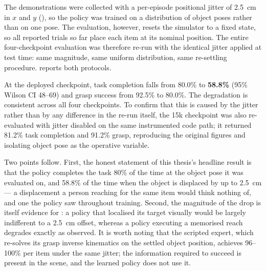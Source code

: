 The demonstrations were collected with a per-episode positional jitter of \SI{2.5}{cm}
in $x$ and $y$ (), so the policy was trained on a distribution of
object poses rather than on one pose. The evaluation, however, resets the simulator to
a fixed state, so all reported trials so far place each item at its nominal position.
The entire four-checkpoint evaluation was therefore re-run with the identical jitter
applied at test time: same magnitude, same uniform distribution, same re-settling
procedure.  reports both protocols.

At the deployed checkpoint, task completion falls from 80.0\% to \textbf{58.8\%}
(95\% Wilson CI 48--69) and grasp success from 92.5\% to 80.0\%. The degradation is
consistent across all four checkpoints. To confirm that this is caused by the jitter
rather than by any difference in the re-run itself, the 15k checkpoint was also
re-evaluated with jitter disabled on the same instrumented code path; it returned
81.2\% task completion and 91.2\% grasp, reproducing the original figures and
isolating object pose as the operative variable.

Two points follow. First, the honest statement of this thesis's headline result is
that the policy completes the task 80\% of the time at the object pose it was
evaluated on, and 58.8\% of the time when the object is displaced by up to \SI{2.5}{cm}
--- a displacement a person reaching for the same item would think nothing of, and one
the policy saw throughout training. Second, the magnitude of the drop is itself evidence for
: a policy that localised its target visually would be
largely indifferent to a \SI{2.5}{cm} offset, whereas a policy executing a memorised
reach degrades exactly as observed. It is worth noting that the scripted expert, which
re-solves its grasp inverse kinematics on the settled object position, achieves
96--100\% per item under the same jitter; the information required to succeed is
present in the scene, and the learned policy does not use it.

